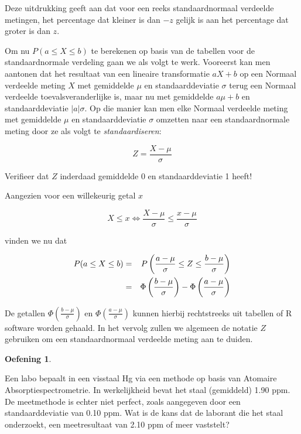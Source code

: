 \documentclass[
  12pt,dutch]{book}
\theoremstyle{definition}
\theoremstyle{definition}
\theoremstyle{definition}
\newtheorem{exercise}{Oefening}[chapter]
\theoremstyle{definition}
\theoremstyle{remark}
\begin{document}
Deze uitdrukking geeft aan dat voor een reeks standaardnormaal verdeelde
metingen, het percentage dat kleiner is dan \(-z\) gelijk is aan
het percentage dat groter is dan \(z\).

Om nu \(P(a\leq X\leq b)\) te berekenen op basis van de tabellen voor de
standaardnormale verdeling gaan we als volgt te werk. Vooreerst kan men
aantonen dat het resultaat van een lineaire transformatie \(aX+b\) op een
Normaal verdeelde meting \(X\) met gemiddelde \(\mu\) en standaarddeviatie \(\sigma\) terug een Normaal verdeelde toevalsveranderlijke is, maar nu
met gemiddelde \(a\mu+b\) en standaarddeviatie \(|a|\sigma\). Op die manier kan
men elke Normaal verdeelde meting met gemiddelde \(\mu\) en standaarddeviatie \(\sigma\) omzetten naar een standaardnormale meting door ze als volgt te
\emph{standaardiseren}:

\begin{equation*}
Z = \frac{X- \mu}{\sigma}
\end{equation*}

Verifieer dat \(Z\) inderdaad gemiddelde 0 en standaarddeviatie 1 heeft!

Aangezien voor een willekeurig getal \(x\)

\begin{equation*}
X\leq x \Leftrightarrow \frac{X-\mu}{\sigma} \leq \frac{x-\mu}{\sigma}
\end{equation*}

vinden we nu dat

\begin{eqnarray*}
P(a \leq X \leq b) & = & P\left(\frac{a-\mu}{\sigma} \leq Z \leq \frac{b-\mu%
}{\sigma} \right) \\
& = & \Phi \left (\frac{b-\mu}{\sigma} \right ) - \Phi \left (\frac{a-\mu}{%
\sigma} \right )
\end{eqnarray*}

De getallen \(\Phi \left (\frac{b-\mu}{\sigma} \right )\) en \(\Phi \left (\frac{a-\mu}{\sigma} \right )\) kunnen hierbij rechtstreeks uit tabellen of R software worden gehaald. In het vervolg zullen we
algemeen de notatie \(Z\) gebruiken om een standaardnormaal verdeelde meting
aan te duiden.

\begin{exercise}
\protect\hypertarget{exr:unnamed-chunk-42}{}\label{exr:unnamed-chunk-42}~
\end{exercise}

Een labo bepaalt in een visstaal Hg via een methode op basis van Atomaire Absorptiespectrometrie. In
werkelijkheid bevat het staal (gemiddeld) 1.90 ppm. De meetmethode is echter
niet perfect, zoals aangegeven door een standaarddeviatie van 0.10 ppm. Wat
is de kans dat de laborant die het staal onderzoekt, een meetresultaat van
2.10 ppm of meer vaststelt?
\end{document}
